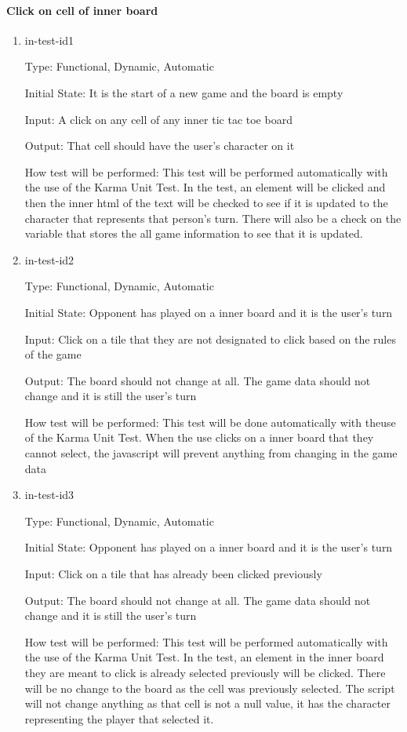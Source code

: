 \documentclass[12pt, titlepage]{article}
\begin{document}
\paragraph{Click on cell of inner board}

\begin{enumerate}

\item{in-test-id1}

Type: Functional, Dynamic, Automatic
					
Initial State: It is the start of a new game and the board is empty
					
Input: A click on any cell of any inner tic tac toe board
					
Output: That cell should have the user's character on it
					
How test will be performed: This test will be performed automatically with the use of the Karma Unit Test. In the test, an element will be clicked and then the inner html of the text will be checked to see if it is updated to the character that represents that person's turn. There will also be a check on the variable that stores the all game information to see that it is updated.
					
\item{in-test-id2}

Type: Functional, Dynamic, Automatic
					
Initial State: Opponent has played on a inner board and it is the user's turn

Input: Click on a tile that they are not designated to click based on the rules of the game
					
Output: The board should not change at all. The game data should not change and it is still the user's turn
					
How test will be performed: This test will be done automatically with theuse of the Karma Unit Test. When the use clicks on a inner board that they cannot select, the javascript will prevent anything from changing in the game data

\item{in-test-id3}

Type: Functional, Dynamic, Automatic
					
Initial State: Opponent has played on a inner board and it is the user's turn
					
Input: Click on a tile that has already been clicked previously
					
Output: The board should not change at all. The game data should not change and it is still the user's turn
					
How test will be performed: This test will be performed automatically with the use of the Karma Unit Test. In the test, an element in the inner board they are meant to click is already selected previously will be clicked. There will be no change to the board as the cell was previously selected. The script will not change anything as that cell is not a null value, it has the character representing the player that selected it.

\end{enumerate}
\end{document}
